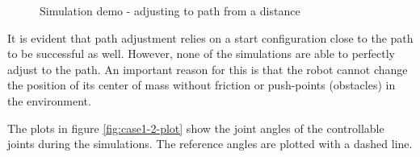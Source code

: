 \begin{figure}[h!]
    
    \caption{Simulation demo - adjusting to path from a distance}
    \label{fig:case1-2b}
\end{figure}

It is evident that path adjustment relies on a start configuration close to the path to be successful as well. However, none of the simulations are able to perfectly adjust to the path. An important reason for this is that the robot cannot change the position of its center of mass without friction or push-points (obstacles) in the environment. 

The plots in figure \ref{fig:case1-2-plot} show the joint angles of the controllable joints during the simulations. The reference angles are plotted with a dashed line.

